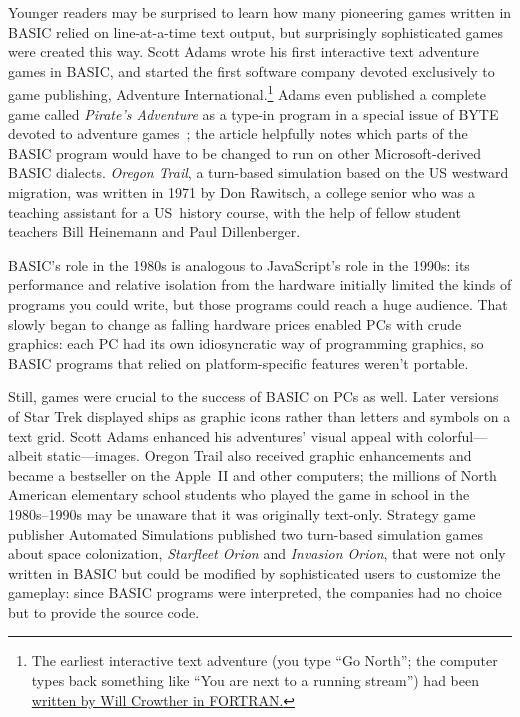 Younger readers may be surprised to learn how many pioneering games
written in BASIC relied on line-at-a-time text output, but
surprisingly sophisticated games were created this way.
Scott Adams wrote his first interactive text adventure games in BASIC, and started
the first software company devoted exclusively to game publishing,
Adventure International.\footnote{The earliest interactive text adventure (you type
``Go North''; the computer types back something like ``You are next to a
running stream'') had been
\href{https://armandofox.blogspot.com/2007/08/the-original-original-adventure.html}{written by Will Crowther in FORTRAN.}}
Adams even published a complete game called \emph{Pirate's Adventure} as
a type-in program in a special issue of BYTE devoted to adventure
games~\cite{byte80:adventure}; the article helpfully notes which parts
of the BASIC program would have to be changed to run on other
Microsoft-derived BASIC dialects.
\emph{Oregon Trail}, a turn-based simulation based on the US westward
migration, was written in 1971 by Don Rawitsch, a college senior who was
a teaching assistant for a US~history course, with the help of
fellow student teachers Bill Heinemann and Paul Dillenberger.


BASIC's role in the 1980s is analogous to JavaScript's role in the
1990s: its performance and relative isolation from the hardware
initially limited
the kinds of programs you could write, but those programs could reach a
huge audience.
That slowly began to change 
as falling hardware prices enabled PCs with crude graphics:
each PC had its own idiosyncratic way of programming graphics, so BASIC
programs that relied on
platform-specific features weren't portable.

Still, games were crucial to the success of BASIC on PCs as well.
Later versions of Star Trek displayed ships as graphic icons rather than
letters and symbols on a text grid.
Scott Adams enhanced his adventures' visual appeal with colorful---albeit
static---images.
Oregon Trail also received graphic enhancements and became
a bestseller on the Apple~II and other computers;
the millions of
North American elementary school students who played the game in school
in the 1980s--1990s
may be unaware that it was originally text-only.
Strategy game publisher
Automated Simulations published two turn-based simulation games about
space colonization,
\emph{Starfleet Orion} and \emph{Invasion Orion}, that were not only
written in BASIC but could be modified by sophisticated users to
customize the gameplay: since BASIC programs were interpreted, the
companies had no choice but to provide the source code.

